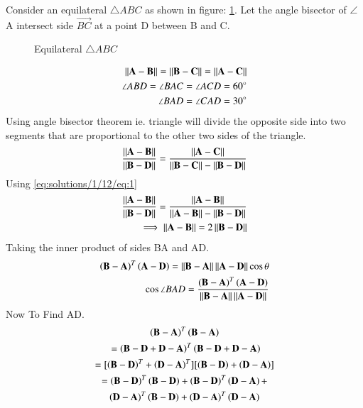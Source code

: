 Consider an equilateral $\triangle{ABC}$ as shown in figure:     \ref{eq:solutions/1/12/fig:es1}. Let the angle bisector of $\angle$A intersect side $\vec{BC}$ at a point D between B and C.
\begin{figure}[!ht]
    \centering
    \resizebox{\columnwidth}{!}{}
    \caption{Equilateral $\triangle{ABC}$}
    \label{eq:solutions/1/12/fig:es1}
\end{figure}
\begin{align}
\label{eq:solutions/1/12/eq:1}\left\lVert\mathbf{A-B}\right\rVert=\left\lVert\mathbf{B-C}\right\rVert=\left\lVert\mathbf{A-C}\right\rVert\\
\angle ABD = \angle BAC = \angle ACD = 60\degree\\
\angle BAD = \angle CAD = 30\degree
\end{align}
Using angle bisector theorem ie. triangle will divide the opposite side into two segments that are proportional to the other two sides of the triangle.\\
\begin{align}
    \frac{\left\lVert\mathbf{A-B}\right\rVert}{\left\lVert\mathbf{B-D}\right\rVert}= \frac{\left\lVert\mathbf{A-C}\right\rVert}{\left\lVert\mathbf{B-C}\right\rVert-\left\lVert\mathbf{B-D}\right\rVert}
\end{align}
Using \eqref{eq:solutions/1/12/eq:1}
\begin{align}
     \frac{\left\lVert\mathbf{A-B}\right\rVert}{\left\lVert\mathbf{B-D}\right\rVert}= \frac{\left\lVert\mathbf{A-B}\right\rVert}{\left\lVert\mathbf{A-B}\right\rVert-\left\lVert\mathbf{B-D}\right\rVert}\\
     \implies\left\lVert\mathbf{A-B}\right\rVert = 2\left\lVert\mathbf{B-D}\right\rVert\label{eq:solutions/1/12/eq:es22}
\end{align}
Taking the inner product of sides BA and AD.
\begin{align}
    \left(\mathbf{B}-\mathbf{A}\right)^T\left(\mathbf{A}-\mathbf{D}\right) =
    \left\lVert\mathbf{B}-\mathbf{A}\right\rVert\left\lVert\mathbf{A}-\mathbf{D}\right\rVert\cos{\theta}\\
    \cos{\angle BAD}=\frac{\left(\mathbf{B}-\mathbf{A}\right)^T\left(\mathbf{A}-\mathbf{D}\right)}{\left\lVert\mathbf{B}-\mathbf{A}\right\rVert\left\lVert\mathbf{A}-\mathbf{D}\right\rVert}\label{eq:solutions/1/12/eq:13}
\end{align}
%
%
%
Now To Find AD.
\begin{multline}
 \brak{\vec{B-A}}^{T}\brak{\vec{B-A}}\\\ =\brak{\vec{B-D+D-A}}^{T}\brak{\vec{B-D+D-A}}\\
 = [\brak{\vec{B-D}}^{T}+\brak{\vec{D-A}}^{T}][\brak{\vec{B-D}}+\brak{\vec{D-A}}]\\
 =\brak{\vec{B-D}}^{T}\brak{\vec{B-D}} + \brak{\vec{B-D}}^{T}\brak{\vec{D-A}} +\\ \brak{\vec{D-A}}^{T}\brak{\vec{B-D}} + \brak{\vec{D-A}}^{T}\brak{\vec{D-A}}
\end{multline}
